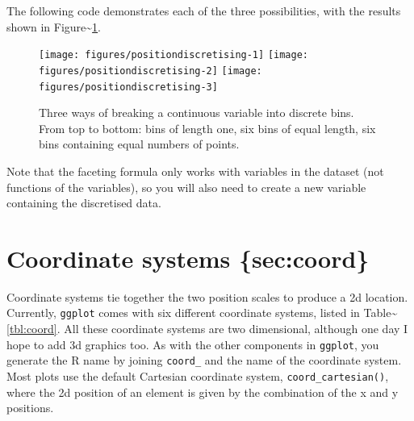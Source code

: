 \noindent The following code demonstrates each of the three
possibilities, with the results shown in
Figure\textasciitilde{}\ref{fig:discretising}.

\begin{Shaded}
\begin{Highlighting}[]
\StringTok{ } \NormalTok{)}
\StringTok{ } \NormalTok{)}
\StringTok{ } \NormalTok{)}

\StringTok{ } \StringTok{ }\NormalTok{(} \NormalTok{, } \NormalTok{)}
\StringTok{ }\NormalTok{(~}\StringTok{ } \NormalTok{)}
\StringTok{ }\NormalTok{(~}\StringTok{ } \NormalTok{)}
\StringTok{ }\NormalTok{(~}\StringTok{ } \NormalTok{)}
\end{Highlighting}
\end{Shaded}

\begin{figure}
\texttt{[image: figures/positiondiscretising-1]} \texttt{[image: figures/positiondiscretising-2]} \texttt{[image: figures/positiondiscretising-3]} \caption{ Three ways of breaking a continuous variable into discrete bins. From top to bottom: bins of length one, six bins of equal length, six bins containing equal numbers of points.\label{fig:discretising}}
\end{figure}

Note that the faceting formula only works with variables in the dataset
(not functions of the variables), so you will also need to create a new
variable containing the discretised data.

\section{Coordinate systems \{sec:coord\}}

Coordinate systems tie together the two position scales to produce a 2d
location. Currently, \texttt{ggplot} comes with six different coordinate
systems, listed in Table\textasciitilde{}\ref{tbl:coord}. All these
coordinate systems are two dimensional, although one day I hope to add
3d graphics too. As with the other components in \texttt{ggplot}, you
generate the R name by joining \texttt{coord\_} and the name of the
coordinate system. Most plots use the default Cartesian coordinate
system, \texttt{coord\_cartesian()}, where the 2d position of an element
is given by the combination of the x and y positions.
 

